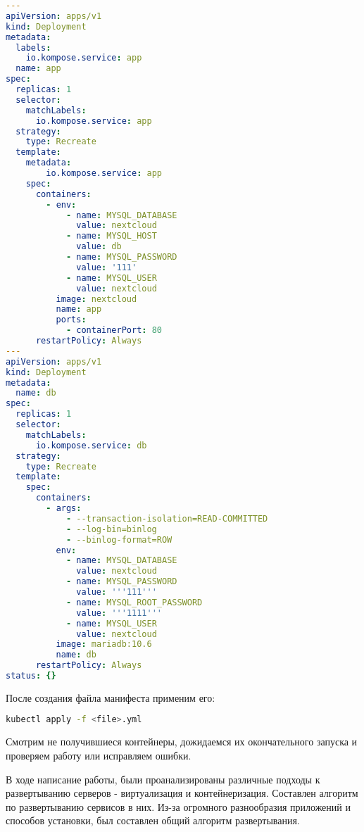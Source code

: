 \begin{lstlisting}[language=yaml]
---
apiVersion: apps/v1
kind: Deployment
metadata:
  labels:
    io.kompose.service: app
  name: app
spec:
  replicas: 1
  selector:
    matchLabels:
      io.kompose.service: app
  strategy:
    type: Recreate
  template:
    metadata:
        io.kompose.service: app
    spec:
      containers:
        - env:
            - name: MYSQL_DATABASE
              value: nextcloud
            - name: MYSQL_HOST
              value: db
            - name: MYSQL_PASSWORD
              value: '111'
            - name: MYSQL_USER
              value: nextcloud
          image: nextcloud
          name: app
          ports:
            - containerPort: 80
      restartPolicy: Always
--- 
apiVersion: apps/v1
kind: Deployment
metadata:
  name: db
spec:
  replicas: 1
  selector:
    matchLabels:
      io.kompose.service: db
  strategy:
    type: Recreate
  template:
    spec:
      containers:
        - args:
            - --transaction-isolation=READ-COMMITTED
            - --log-bin=binlog
            - --binlog-format=ROW
          env:
            - name: MYSQL_DATABASE
              value: nextcloud
            - name: MYSQL_PASSWORD
              value: '''111'''
            - name: MYSQL_ROOT_PASSWORD
              value: '''1111'''
            - name: MYSQL_USER
              value: nextcloud
          image: mariadb:10.6
          name: db
      restartPolicy: Always
status: {}
\end{lstlisting}

После создания файла манифеста применим его:
\begin{lstlisting}[language=bash]
    kubectl apply -f <file>.yml
\end{lstlisting}

Смотрим не получившиеся контейнеры, дожидаемся их окончательного запуска и проверяем работу или исправляем ошибки.

В ходе написание работы, были проанализированы различные подходы к развертыванию серверов - виртуализация и контейнеризация. Составлен алгоритм по развертыванию сервисов в них. Из-за огромного разнообразия приложений и способов установки, был составлен общий алгоритм развертывания.

\begingroup
\renewcommand{\section}[2]{\annotation{СПИСОК ИСПОЛЬЗОВАННЫХ ИСТОЧНИКОВ}}

\endgroup


\clearpage